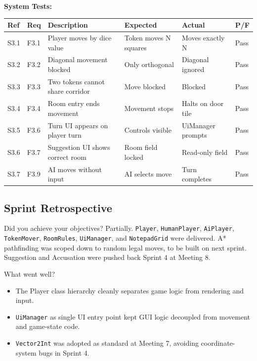 \textbf{System Tests:}
\begin{table}[H]
\centering
\footnotesize
\begin{tabular}{|l|l|p{3.8cm}|p{2.8cm}|p{2.8cm}|l|}
\hline
\textbf{Ref} & \textbf{Req} & \textbf{Description} & \textbf{Expected} & \textbf{Actual} & \textbf{P/F} \\ \hline
S3.1 & F3.1 & Player moves by dice value & Token moves N squares & Moves exactly N & Pass \\ \hline
S3.2 & F3.2 & Diagonal movement blocked & Only orthogonal & Diagonal ignored & Pass \\ \hline
S3.3 & F3.3 & Two tokens cannot share corridor & Move blocked & Blocked & Pass \\ \hline
S3.4 & F3.4 & Room entry ends movement & Movement stops & Halts on door tile & Pass \\ \hline
S3.5 & F3.6 & Turn UI appears on player turn & Controls visible & UiManager prompts & Pass \\ \hline
S3.6 & F3.7 & Suggestion UI shows correct room & Room field locked & Read-only field & Pass \\ \hline
S3.7 & F3.9 & AI moves without input & AI selects move & Turn completes & Pass \\ \hline
\end{tabular}
\end{table}

\subsection*{Sprint Retrospective}

Did you achieve your objectives? Partially. \texttt{Player}, \texttt{HumanPlayer}, \texttt{AiPlayer}, \texttt{TokenMover}, \texttt{RoomRules}, \texttt{UiManager}, and \texttt{NotepadGrid} were delivered. A* pathfinding was scoped down to random legal moves, to be built on next sprint. Suggestion and Accusation were pushed back Sprint 4 at Meeting 8.

What went well?
\begin{itemize}
    \item The Player class hierarchy cleanly separates game logic from rendering and input.
    \item \texttt{UiManager} as single UI entry point kept GUI logic decoupled from movement and game-state code.
    \item \texttt{Vector2Int} was adopted as standard at Meeting 7, avoiding coordinate-system bugs in Sprint 4.
\end{itemize}

